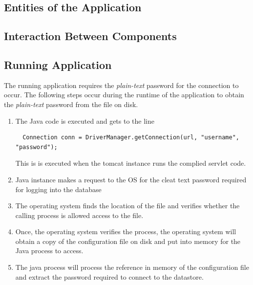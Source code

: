\documentclass[11pt, a4paper, twoside, notitlepage]{article}
\begin{document}
\subsection*{Entities of the Application}


\subsection*{Interaction Between Components}
\subsection*{Running Application}
The running application requires the \emph{plain-text} password for the connection to occur. The following steps occur during the runtime of the application to obtain the \emph{plain-text} password from the file on disk. 

\begin{enumerate}
\item The Java code is executed and gets to the line
\begin{lstlisting}
  Connection conn = DriverManager.getConnection(url, "username", "password");
\end{lstlisting}
This is is executed when the tomcat instance runs the complied servlet code.
\item Java instance makes a request to the OS for the cleat text password required for logging into the database
\item The operating system finds the location of the file and verifies whether the calling process is allowed access to the file.
\item Once, the operating system verifies the process, the operating system will obtain a copy of the configuration file on disk and put into memory for the Java process to access.
\item The java process will process the reference in memory of the configuration file and extract the password required to connect to the datastore.
\end{enumerate}
\end{document}
